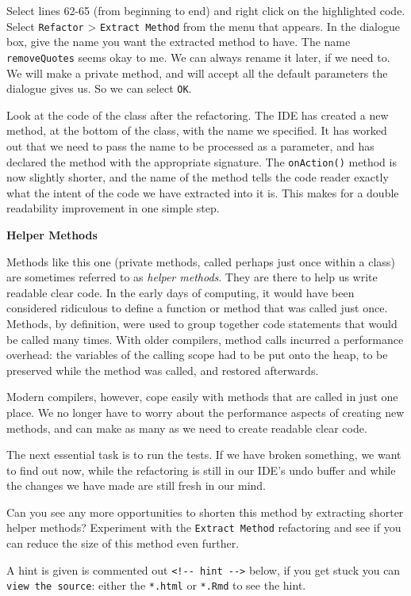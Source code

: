 \documentclass[
]{book}
\begin{document}
Select lines 62-65 (from beginning to end) and right click on the highlighted code. Select \texttt{Refactor} \textgreater{} \texttt{Extract\ Method} from the menu that appears. In the dialogue box, give the name you want the extracted method to have. The name \texttt{removeQuotes} seems okay to me. We can always rename it later, if we need to. We will make a private method, and will accept all the default parameters the dialogue gives us. So we can select \texttt{OK}.

Look at the code of the class after the refactoring. The IDE has created a new method, at the bottom of the class, with the name we specified. It has worked out that we need to pass the name to be processed as a parameter, and has declared the method with the appropriate signature. The \texttt{onAction()} method is now slightly shorter, and the name of the method tells the code reader exactly what the intent of the code we have extracted into it is. This makes for a double readability improvement in one simple step.

\textbf{Helper Methods}

Methods like this one (private methods, called perhaps just once within a class) are sometimes referred to as \emph{helper methods}. They are there to help us write readable clear code. In the early days of computing, it would have been considered ridiculous to define a function or method that was called just once. Methods, by definition, were used to group together code statements that would be called many times. With older compilers, method calls incurred a performance overhead: the variables of the calling scope had to be put onto the heap, to be preserved while the method was called, and restored afterwards.

Modern compilers, however, cope easily with methods that are called in just one place. We no longer have to worry about the performance aspects of creating new methods, and can make as many as we need to create readable clear code.

The next essential task is to run the tests. If we have broken something, we want to find out now, while the refactoring is still in our IDE's undo buffer and while the changes we have made are still fresh in our mind.

Can you see any more opportunities to shorten this method by extracting shorter helper methods? Experiment with the \texttt{Extract\ Method} refactoring and see if you can reduce the size of this method even further.

A hint is given is commented out \texttt{\textless{}!-\/-\ hint\ -\/-\textgreater{}} below, if you get stuck you can \texttt{view\ the\ source}: either the \texttt{*.html} or \texttt{*.Rmd} to see the hint.
\end{document}
